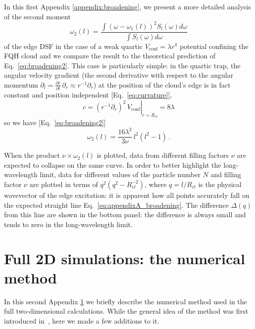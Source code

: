 \documentclass[twocolumn,pra,superscriptaddress,noshowpacs]{revtex4}
\begin{document}
In this first Appendix \ref{appendix:broadening}, we present a more detailed analysis of the second moment
\begin{equation}
    \omega_2(l) = \frac{\int (\omega - \omega_1(l))^2 S_l(\omega) d\omega}{\int S_l(\omega) d\omega}
\end{equation}
 of the edge DSF in the case of a weak quartic $V_\text{conf}=\lambda r^4$ potential confining the FQH cloud and we compare the result to the theoretical prediction of Eq.~\eqref{eq:broadening2}.
This case is particularly simple: in the quartic trap, the angular velocity gradient (the second derivative with respect to the angular momentum $\partial_l = \frac{\partial r}{\partial l}\,\partial_r\approx r^{-1}\partial_r$) at the position of the cloud's edge is in fact constant and position independent [Eq.~\eqref{eq:curvature}], 
\begin{equation}
c=\left.(r^{-1}\partial_r)^2\,V_\text{conf}\right|_{r=R_{cl}}=8\lambda    
\end{equation}
so we have [Eq.~\eqref{eq:broadening2}]
\begin{equation}
    \label{eq:appendixA_broadening}
    \omega_2(l) = \frac{16\lambda^2}{3\nu}\,l^2(l^2-1)\,.
\end{equation}

When the product $\nu\times \omega_2(l)$ is plotted, data from different filling factors $\nu$ are expected to collapse on the same curve.
In order to better highlight the long-wavelength limit, data for different values of the particle number $N$ and filling factor $\nu$ are plotted in terms of $q^2(q^2-R_{cl}^{-2})$, where $q=l/R_{cl}$ is the physical wavevector of the edge excitation: it is apparent how all points accurately fall on the expected straight line Eq.~\eqref{eq:appendixA_broadening}. The difference $\Delta(q)$ from this line are shown in the bottom panel: the difference is always small and tends to zero in the long-wavelength limit.

\section{Full 2D simulations: the numerical method}\label{appendix:MonteCarlo}
In this second Appendix \ref{appendix:MonteCarlo} we briefly describe the numerical method used in the full two-dimensional calculations. While the general idea of the method was first introduced in~\cite{Nardin_PRA_2023}, here we made a few additions to it.
\end{document}
